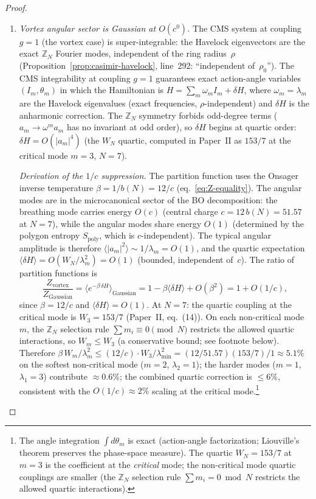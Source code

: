 \begin{proof}
\begin{enumerate}
\item[\emph{5a.}] \emph{Vortex angular sector is Gaussian at $O(c^0)$.}
  The CMS system at coupling $g = 1$ (the vortex case)
  is super-integrable: the Havelock eigenvectors are
  the exact $\mathbb{Z}_N$ Fourier modes, independent
  of the ring radius~$\rho$
  (Proposition~\ref{prop:casimir-havelock}, line~292:
  ``independent of~$\rho_0$'').
  The CMS integrability at coupling $g = 1$
  guarantees exact action-angle variables
  $(I_m, \theta_m)$ in which the Hamiltonian is
  $H = \sum_m \omega_m I_m + \delta H$,
  where $\omega_m = \lambda_m$ are the Havelock
  eigenvalues (exact frequencies, $\rho$-independent)
  and $\delta H$ is the anharmonic correction.
  The $\mathbb{Z}_N$ symmetry forbids odd-degree terms
  ($a_m \to \omega^m a_m$ has no invariant at odd order),
  so $\delta H$ begins at quartic order:
  $\delta H = O(|a_m|^4)$
  (the $W_N$ quartic, computed in Paper~II as $153/7$
  at the critical mode $m = 3$, $N = 7$).

  \emph{Derivation of the $1/c$ suppression.}
  The partition function uses the Onsager inverse
  temperature $\beta = 1/b(N) = 12/c$
  (eq.~\eqref{eq:Z-equality}).
  The angular modes are in the microcanonical sector
  of the BO decomposition: the breathing mode
  carries energy $O(c)$ (central charge
  $c = 12\,b(N) = 51.57$ at $N = 7$),
  while the angular modes share energy $O(1)$
  (determined by the polygon entropy $S_{\mathrm{poly}}$,
  which is $c$-independent).
  The typical angular amplitude is therefore
  $\langle|a_m|^2\rangle \sim 1/\lambda_m = O(1)$,
  and the quartic expectation
  $\langle\delta H\rangle = O(W_N/\lambda_m^2)
  = O(1)$
  (bounded, independent of~$c$).
  The ratio of partition functions is
  \begin{equation}\label{eq:quartic-suppression}
    \frac{Z_{\mathrm{vortex}}}{Z_{\mathrm{Gaussian}}}
    = \langle e^{-\beta\,\delta H}\rangle_{\mathrm{Gaussian}}
    = 1 - \beta\langle\delta H\rangle + O(\beta^2)
    = 1 + O(1/c),
  \end{equation}
  since $\beta = 12/c$ and $\langle\delta H\rangle = O(1)$.
  At $N = 7$: the quartic coupling at the critical mode
  is $W_3 = 153/7$ (Paper~II, eq.~(14)).
  On each non-critical mode~$m$, the $\mathbb{Z}_N$
  selection rule $\sum m_i \equiv 0 \pmod{N}$ restricts
  the allowed quartic interactions, so $W_m \le W_3$
  (a conservative bound; see footnote below).
  Therefore $\beta\,W_m/\lambda_m^2
  \le (12/c) \cdot W_3/\lambda_{\min}^2
  = (12/51.57)(153/7)/1 \approx 5.1\%$
  on the softest non-critical mode ($m = 2$,
  $\lambda_2 = 1$);
  the harder modes ($m = 1$, $\lambda_1 = 3$)
  contribute $\approx 0.6\%$; the combined quartic
  correction is $\le 6\%$, consistent with the
  $O(1/c) \approx 2\%$ scaling at the
  critical mode.\footnote{%
  The angle integration $\int d\theta_m$ is exact
  (action-angle factorization; Liouville's theorem
  preserves the phase-space measure).
  The quartic $W_N = 153/7$ at $m = 3$ is the
  coefficient at the \emph{critical} mode;
  the non-critical mode quartic couplings are
  smaller (the $\mathbb{Z}_N$ selection rule
  $\sum m_i = 0 \bmod N$ restricts the allowed
  quartic interactions).}


\end{enumerate}
\end{proof}
